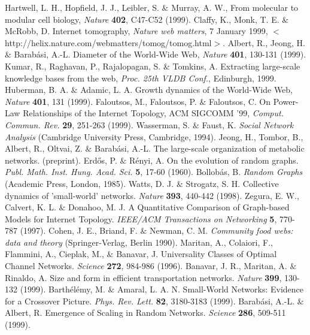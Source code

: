 \begin{references}
Hartwell, L. H., Hopfield, J. J., Leibler, S. $\&$ Murray, A. W., From molecular to modular cell biology, {\it Nature} {\bf 402}, C47-C52 (1999).
Claffy, K., Monk, T. E. $\&$ McRobb, D. Internet tomography, {\it Nature web matters}, 7 January 1999,
$<$http://helix.nature.com/webmatters/tomog/tomog.html$>$.
Albert, R., Jeong, H. $\&$ Barab\'asi, A.-L. Diameter of the World-Wide Web, {\it Nature} {\bf 401}, 130-131 (1999).
 Kumar, R.,  Raghavan, P., Rajalopagan, S. $\&$ Tomkins, A. Extracting large-scale knowledge bases from the web, {\it Proc. 25th VLDB Conf.}, Edinburgh, 1999. 
Huberman, B. A. $\&$ Adamic, L. A. Growth dynamics of the World-Wide Web, {\it Nature} {\bf 401}, 131 (1999).
Faloutsos, M., Faloutsos, P. $\&$ Faloutsos, C. On Power-Law Relationships of the Internet Topology, ACM SIGCOMM '99, {\it Comput. Commun. Rev.} {\bf 29}, 251-263 (1999).
Wasserman, S. $\&$ Faust, K. {\it Social Network Analysis} (Cambridge University Press, Cambridge, 1994).
Jeong, H., Tombor, B., Albert, R., Oltvai, Z. $\&$ Barab\'asi, A.-L. The large-scale organization of metabolic networks. (preprint).
  Erd\H{o}s, P. $\&$ R\'enyi, A. On the evolution of random graphs. {\it Publ. Math. Inst. Hung. Acad. Sci.} {\bf 5}, 17-60 (1960).
 Bollob\'as, B. {\it Random Graphs} (Academic Press, London, 1985).
 Watts, D. J. $\&$ Strogatz, S. H. Collective dynamics of 'small-world' networks. {\it Nature} {\bf 393}, 440-442 (1998).
 Zegura, E. W., Calvert, K. L. $\&$ Donahoo, M. J. A Quantitative Comparison of Graph-based Models for Internet Topology. {\it IEEE/ACM Transactions on Networking} {\bf 5}, 770-787 (1997).
 Cohen, J. E., Briand, F. $\&$ Newman, C. M. {\it Community food webs: data and theory} (Springer-Verlag, Berlin 1990).
 Maritan, A.,  Colaiori, F., Flammini, A., Cieplak, M., $\&$ Banavar, J. Universality Classes of Optimal Channel Networks. {\it Science} {\bf 272}, 984-986 (1996).
 Banavar, J. R., Maritan, A. $\&$ Rinaldo, A. Size and form in efficient transportation networks. {\it Nature} {\bf 399}, 130-132 (1999).
 Barth\'el\'emy, M. $\&$  Amaral, L. A. N. Small-World Networks: Evidence for a Crossover Picture. {\it Phys. Rev. Lett.} {\bf 82}, 3180-3183 (1999).
 Barab\'asi, A.-L. $\&$ Albert, R. Emergence of Scaling in Random Networks. {\it Science} {\bf 286}, 509-511 (1999).

\end{references}
